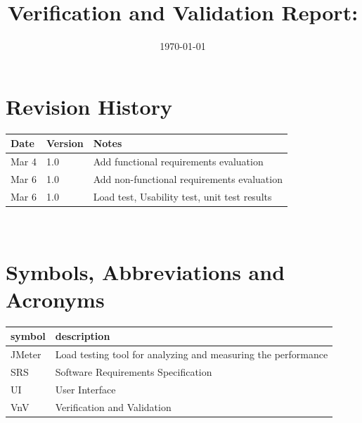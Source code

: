 \documentclass[12pt, titlepage]{article}
\begin{document}
\title{Verification and Validation Report: \progname} 
\author{\authname}
\date{\today}
	
\maketitle


\section{Revision History}

\begin{tabularx}{\textwidth}{p{3cm}p{2cm}X}
\toprule {\bf Date} & {\bf Version} & {\bf Notes}\\
\midrule
Mar 4 & 1.0 & Add functional requirements evaluation\\
Mar 6 & 1.0 & Add non-functional requirements evaluation\\
Mar 6 & 1.0 & Load test, Usability test, unit test results\\
\bottomrule
\end{tabularx}

~\newpage

\section{Symbols, Abbreviations and Acronyms}

\renewcommand{\arraystretch}{1.2}
\begin{tabular}{l l} 
  \toprule		
  \textbf{symbol} & \textbf{description}\\
  \midrule 
  JMeter & Load testing tool for analyzing and measuring the performance\\
  \midrule 
  SRS & Software Requirements Specification\\
  \midrule 
  UI & User Interface\\
  \midrule 
  VnV & Verification and Validation\\
  \bottomrule
\end{tabular}\\

\newpage

\tableofcontents

\listoftables %

\listoffigures %

\newpage

\end{document}
